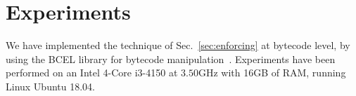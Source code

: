 \section{Experiments}\label{sec:experiments}

We have implemented the technique of Sec.~\ref{sec:enforcing}
at bytecode level, by using the BCEL
library for bytecode manipulation~\cite{bcel}.
Experiments have been performed on
an Intel 4-Core i3-4150 at $3.50$GHz with 16GB of RAM, running Linux Ubuntu 18.04.


